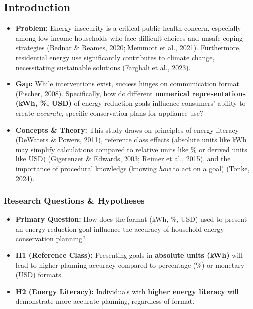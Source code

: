 \documentclass[
  12pt,
]{article}
\providecommand{\tightlist}{%
  \setlength{\itemsep}{0pt}\setlength{\parskip}{0pt}}
\begin{document}
\begin{multicols}{3}
\raggedright %

\subsection{Introduction}\label{introduction}

\begin{itemize}
\tightlist
\item
  \textbf{Problem:} Energy insecurity is a critical public health
  concern, especially among low-income households who face difficult
  choices and unsafe coping strategies (Bednar \& Reames, 2020; Memmott
  et al., 2021). Furthermore, residential energy use significantly
  contributes to climate change, necessitating sustainable solutions
  (Farghali et al., 2023).
\item
  \textbf{Gap:} While interventions exist, success hinges on
  communication format (Fischer, 2008). Specifically, how do different
  \textbf{numerical representations (kWh, \%, USD)} of energy reduction
  goals influence consumers' ability to create \emph{accurate}, specific
  conservation plans for appliance use?
\item
  \textbf{Concepts \& Theory:} This study draws on principles of energy
  literacy (DeWaters \& Powers, 2011), reference class effects (absolute
  units like kWh may simplify calculations compared to relative units
  like \% or derived units like USD) (Gigerenzer \& Edwards, 2003;
  Reimer et al., 2015), and the importance of procedural knowledge
  (knowing \emph{how} to act on a goal) (Tonke, 2024).
\end{itemize}

\subsubsection{Research Questions \&
Hypotheses}\label{research-questions-hypotheses}

\begin{itemize}
\tightlist
\item
  \textbf{Primary Question:} How does the format (kWh, \%, USD) used to
  present an energy reduction goal influence the accuracy of household
  energy conservation planning?
\item
  \textbf{H1 (Reference Class):} Presenting goals in \textbf{absolute
  units (kWh)} will lead to higher planning accuracy compared to
  percentage (\%) or monetary (USD) formats.
\item
  \textbf{H2 (Energy Literacy):} Individuals with \textbf{higher energy
  literacy} will demonstrate more accurate planning, regardless of
  format.
\end{itemize}


\end{multicols}
\end{document}
